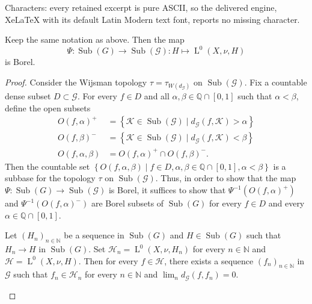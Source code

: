 \documentclass[10pt,a4paper]{amsart}
\newcommand{\N}{\mathbb{N}}
\newcommand{\Sub}{\operatorname{Sub}}
\newcommand{\rL}{\operatorname{L}}
\begin{document}
Characters: every retained excerpt is pure ASCII, so the delivered engine, XeLaTeX with its default Latin Modern text font, reports no missing character.
\begin{prop}\label{prop-borel}
Keep the same notation as above. Then the map 
$$\Psi : \Sub(G) \to \Sub(\mathscr G) : H \mapsto \rL^0(X, \nu, H)$$ 
is Borel.
\end{prop}

\begin{proof}
Consider the Wijsman topology $\tau = \tau_{W(d_{\mathscr G})}$ on $\Sub(\mathscr G)$. Fix a countable dense subset $D \subset \mathscr G$. For every $f \in D$ and all $\alpha, \beta \in \mathbb Q \cap [0, 1]$ such that $\alpha < \beta$, define the open subsets 
\begin{align*}
O(f, \alpha)^+ &= \left \{\mathscr K \in \Sub(\mathscr G) \mid d_{\mathscr G}(f, \mathscr K) > \alpha \right \} \\
O(f, \beta)^- &= \left \{\mathscr K \in \Sub(\mathscr G) \mid d_{\mathscr G}(f, \mathscr K) < \beta \right \} \\
O(f, \alpha, \beta) &= O(f, \alpha)^+ \cap O(f, \beta)^-.
\end{align*}
Then the countable set $\left \{ O(f, \alpha, \beta) \mid f \in D, \alpha, \beta \in \mathbb Q \cap [0, 1],\alpha < \beta \right \}$ is a subbase for the topology $\tau$ on $\Sub(\mathscr G)$. Thus, in order to show that the map $\Psi : \Sub(G) \to \Sub(\mathscr G)$ is Borel, it suffices to show that $\Psi^{-1}(O(f, \alpha)^+)$ and $\Psi^{-1}(O(f, \alpha)^-)$ are Borel subsets of $\Sub(G)$ for every $f \in D$ and every $\alpha \in \mathbb Q \cap [0, 1]$.


\begin{claim}\label{claim-lusin}
Let $(H_n)_{n \in \N}$ be a sequence in $\Sub(G)$ and $H \in \Sub(G)$ such that $H_n \to H$ in $\Sub(G)$. Set $\mathscr H_n = \rL^0(X, \nu, H_n)$ for every $n \in \N$ and $\mathscr H = \rL^0(X, \nu, H)$. Then for every $f \in \mathscr H$, there exists a sequence $(f_n)_{n \in \N}$ in $\mathscr G$ such that $f_n \in \mathscr H_n$ for every $n \in \N$ and $\lim_n d_{\mathscr G}(f, f_n) = 0$.
\end{claim}


\end{proof}
\end{document}
